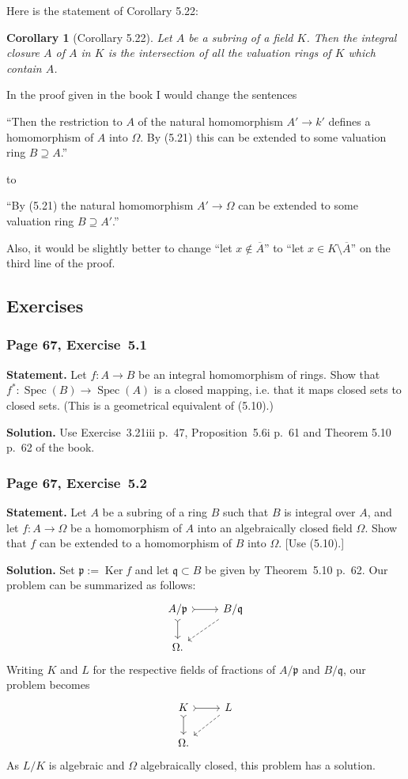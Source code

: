 \documentclass[12pt,letterpaper]{article}%
\newcommand{\oo}{\operatorname}\newcommand{\ooo}{\operatorname*}
\newcommand{\mf}{\mathfrak}
\newcommand{\ppp}{\mf p}
\newcommand{\qqq}{\mf q}
\newcommand{\Spec}{\operatorname{Spec}}\newcommand{\Sp}{\operatorname{Spec}}
\newcommand{\nn}{\noindent}
\newtheorem{cor}[thm]{Corollary}
\begin{document}
Here is the statement of Corollary 5.22:

\begin{cor}[Corollary 5.22]\label{c522}
Let $A$ be a subring of a field $K$. Then the integral closure $A$ of $A$
in $K$ is the intersection of all the valuation rings of $K$ which contain $A$.
\end{cor}

In the proof given in the book I would change the sentences

``Then the restriction to $A$ of the natural homomorphism $A'\to k'$ defines a homomorphism of $A$ into $\Omega$. By (5.21) this can be extended to some valuation ring $B\supseteq A$.''

\nn to 

``By (5.21) the natural homomorphism $A'\to\Omega$ can be extended to some valuation ring $B\supseteq A'$.'' 

Also, it would be slightly better to change ``let $x\notin\overline A$'' to ``let $x\in K\setminus\overline A$'' on the third line of the proof.

\subsection{Exercises}%

\subsubsection{Page 67, Exercise~5.1}\label{ex5.1}%

\textbf{Statement.} Let $f:A\to B$ be an integral homomorphism of rings. Show that $f^*:\Spec(B)\to\Spec(A)$ is a closed mapping, i.e. that it maps closed sets to closed sets. (This is a geometrical equivalent of (5.10).)

\nn\textbf{Solution.} Use Exercise~3.21iii p.~47, Proposition~5.6i p.~61 and Theorem 5.10 p.~62 of the book.

\subsubsection{Page 67, Exercise~5.2}\label{ex5.2}%

\textbf{Statement.} Let $A$ be a subring of a ring $B$ such that $B$ is integral over $A$, and let $f:A\to\Omega$ be a homomorphism of $A$ into an algebraically closed field $\Omega$. Show that $f$ can be extended to a homomorphism of $B$ into $\Omega$. [Use (5.10).]

\nn\textbf{Solution.} Set $\ppp:=\oo{Ker}f$ and let $\qqq\subset B$ be given by Theorem~5.10 p.~62. Our problem can be summarized as follows: 
$$
\begin{tikzcd}
A/\ppp\ar[r,tail]\ar[d,tail]&B/\qqq\ar[dl,dashrightarrow]\\ 
\Omega.
\end{tikzcd}
$$ 
Writing $K$ and $L$ for the respective fields of fractions of $A/\ppp$ and $B/\qqq$, our problem becomes  
$$
\begin{tikzcd}
K\ar[r,tail]\ar[d,tail]&L\ar[dl,dashrightarrow]\\ 
\Omega.
\end{tikzcd}
$$ 
As $L/K$ is algebraic and $\Omega$ algebraically closed, this problem has a solution.
\end{document}
